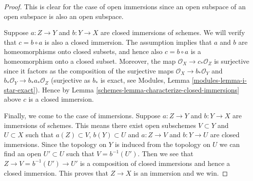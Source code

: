 \begin{proof}

This is clear for the case of open immersions since an open subspace of
an open subspace is also an open subspace.

\medskip\noindent
Suppose $a : Z \to Y$ and $b : Y \to X$ are closed immersions of schemes.
We will verify that $c = b \circ a$ is also a closed immersion.
The assumption implies that $a$ and $b$ are homeomorphisms onto closed subsets,
and hence also $c = b \circ a$ is a homeomorphism onto a closed subset.
Moreover, the map $\mathcal{O}_X \to c_*\mathcal{O}_Z$ is surjective
since it factors as the composition of the surjective maps
$\mathcal{O}_X \to b_*\mathcal{O}_Y$ and
$b_*\mathcal{O}_Y \to b_*a_*\mathcal{O}_Z$ (surjective as $b_*$ is exact,
see Modules, Lemma \ref{modules-lemma-i-star-exact}).
Hence by Lemma \ref{schemes-lemma-characterize-closed-immersions}
above $c$ is a closed immersion.

\medskip\noindent
Finally, we come to the case of immersions.
Suppose $a : Z \to Y$ and $b : Y \to X$ are immersions of schemes.
This means there exist open subschemes
$V \subset Y$ and $U \subset X$ such that
$a(Z) \subset V$, $b(Y) \subset U$ and $a : Z \to V$
and $b : Y \to U$ are closed immersions.
Since the topology on $Y$ is induced from the topology on
$U$ we can find an open $U' \subset U$ such that
$V = b^{-1}(U')$. Then we see that
$Z \to V = b^{-1}(U') \to U'$ is a composition of
closed immersions and hence a closed immersion.
This proves that $Z \to X$ is an immersion and we win.
\end{proof}



